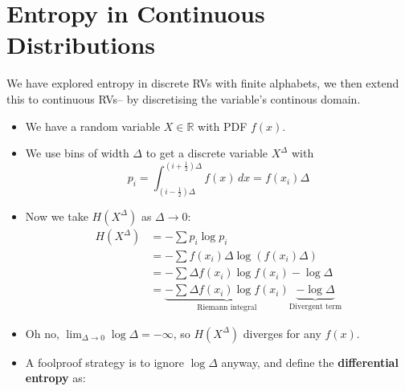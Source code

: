 
\section{Entropy in Continuous Distributions}

We have explored entropy in discrete RVs with finite alphabets, we then extend this to continuous RVs– by discretising the variable's continous domain.

\begin{itemize}
    \item We have a random variable \( X \in \mathbb{R} \) with PDF \( f(x) \).
    \item We use bins of width \( \Delta \) to get a discrete variable \( X^{\Delta} \) with
          \[
              p_i = \int_{(i - \frac{1}{2})\Delta}^{(i + \frac{1}{2})\Delta} f(x) \, dx = f(x_i) \Delta
          \]
    \item Now we take \( H(X^{\Delta}) \) as \( \Delta \to 0 \):
          \begin{align*}
              H(X^{\Delta}) & = -\sum p_i \log p_i                                                                                                         \\
                            & = -\sum f(x_i) \Delta \log(f(x_i) \Delta)                                                                                    \\
                            & = -\sum \Delta f(x_i) \log f(x_i) - \log \Delta                                                                              \\
                            & = \underbrace{-\sum \Delta f(x_i) \log f(x_i)}_{\text{Riemann integral}}  \underbrace{- \log \Delta}_{\text{Divergent term}}
          \end{align*}
    \item Oh no, \( \lim_{\Delta \to 0} \log \Delta = -\infty \), so \( H(X^{\Delta}) \) diverges for any \( f(x) \).
    \item A foolproof strategy is to ignore $\log \Delta$ anyway, and define the \textbf{differential entropy} as:
\end{itemize}

